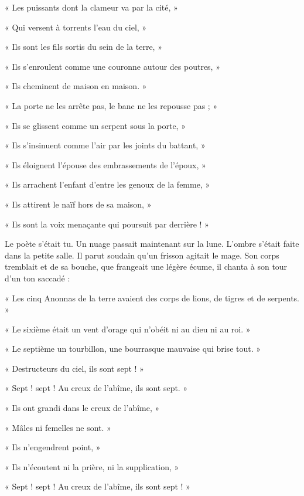 \documentclass[a4paper, 11pt, oneside, polutonikogreek, french]{article}
\begin{document}
« Les puissants dont la clameur va par la cité, »

« Qui versent à torrents l'eau du ciel, »

« Ils sont les fils sortis du sein de la terre, »

« Ils s'enroulent comme une couronne autour des poutres, »

« Ils cheminent de maison en maison. »

« La porte ne les arrête pas, le banc ne les repousse pas ; »

« Ils se glissent comme un serpent sous la porte, »

« Ils s'insinuent comme l'air par les joints du battant, »

« Ils éloignent l'épouse des embrassements de l'époux, »

« Ils arrachent l'enfant d'entre les genoux de la femme, »

« Ils attirent le naïf hors de sa maison, »

« Ils sont la voix menaçante qui poursuit par derrière ! »

\bigskip
\centerline{\EightStarTaper}
\centerline{\EightStarTaper\EightStarTaper}
\bigskip

Le poète s'était tu. Un nuage passait maintenant sur la lune. L'ombre s'était faite dans la petite salle. Il parut soudain qu'un frisson agitait le mage. Son corps tremblait et de sa bouche, que frangeait une légère écume, il chanta à son tour d'un ton saccadé :

\bigskip
\centerline{\EightStarTaper}
\centerline{\EightStarTaper\EightStarTaper}
\bigskip

« Les cinq Anonnas de la terre avaient des corps de lions, de tigres et de serpents. »

« Le sixième était un vent d'orage qui n'obéit ni au dieu ni au roi. »

« Le septième un tourbillon, une bourrasque mauvaise qui brise tout. »

« Destructeurs du ciel, ils sont sept ! »

« Sept ! sept ! Au creux de l'abîme, ils sont sept. »

« Ils ont grandi dans le creux de l'abîme, »

« Mâles ni femelles ne sont. »

« Ils n'engendrent point, »

« Ils n'écoutent ni la prière, ni la supplication, »

« Sept ! sept ! Au creux de l'abîme, ils sont sept ! »
\end{document}
